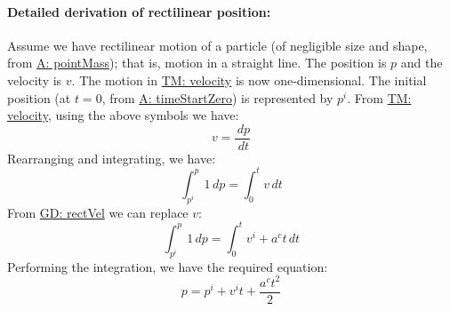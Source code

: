 \documentclass[12pt]{article}
\begin{document}
\paragraph{Detailed derivation of rectilinear position:}
\label{GD:rectPosDeriv}
Assume we have rectilinear motion of a particle (of negligible size and shape, from \hyperref[pointMass]{A: pointMass}); that is, motion in a straight line. The position is $p$ and the velocity is $v$. The motion in \hyperref[TM:velocity]{TM: velocity} is now one-dimensional. The initial position (at $t=0$, from \hyperref[timeStartZero]{A: timeStartZero}) is represented by ${p^{i}}$. From \hyperref[TM:velocity]{TM: velocity}, using the above symbols we have:
\begin{displaymath}
v=\frac{\,dp}{\,dt}
\end{displaymath}
Rearranging and integrating, we have:
\begin{displaymath}
\int_{{p^{i}}}^{p}{1}\,dp=\int_{0}^{t}{v}\,dt
\end{displaymath}
From \hyperref[GD:rectVel]{GD: rectVel} we can replace $v$:
\begin{displaymath}
\int_{{p^{i}}}^{p}{1}\,dp=\int_{0}^{t}{{v^{i}}+{a^{c}} t}\,dt
\end{displaymath}
Performing the integration, we have the required equation:
\begin{displaymath}
p={p^{i}}+{v^{i}} t+\frac{{a^{c}} t^{2}}{2}
\end{displaymath}
\par~
\end{document}
